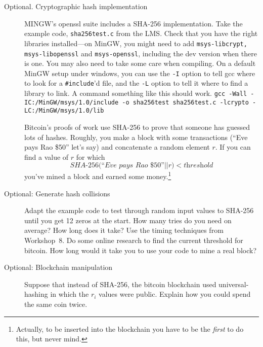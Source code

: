 \documentclass[11pt]{article}
\newcommand{\concat}{||}
\begin{document}
\begin{description}
\item[Optional.  Cryptographic hash implementation]
    MINGW's openssl suite includes a SHA-256 implementation.
        Take the example code,
        {\tt sha256test.c} from the {LMS}.
        Check that you have the right libraries installed---on MinGW,
        you might need to add {\tt msys-libcrypt, msys-libopenssl} and
        {\tt msys-openssl},
        including the dev version when there is one.
        You may also need to take some care when compiling.
        On a default MinGW setup under windows,
        you can use the {\tt -I} option to tell gcc where to look for a {\tt \#include}'d file,
        and the {\tt -L} option to tell it where to find a library to link.
        A command something like this should work.
        {\tt gcc -Wall -IC:/MinGW/msys/1.0/include -o sha256test sha256test.c -lcrypto -LC:/MinGW/msys/1.0/lib}

Bitcoin's proofs of work use SHA-256 to prove that someone has guessed lots of hashes.
        Roughly, you make a block with some transactions (``Eve pays Rao \$50'' let's say) and concatenate a random element $r$.
        If you can find a value of $r$ for which
        $$\textit{SHA-256(``Eve pays Rao \$50''} \concat r) < \textit{threshold}$$
        you've mined a block and earned some money.\footnote{
            Actually, to be inserted into the blockchain you have to be the \emph{first} to do this, but never mind.
        }

\item[Optional: Generate hash collisions]
    Adapt the example code to test through random input values to SHA-256 until you get 12 zeros at the start.
        How many tries do you need on average?
        How long does it take?
        Use the timing techniques from Workshop~8.
        Do some online research to find the current threshold for bitcoin.
        How long would it take you to use your code to mine a real block?

\item[Optional: Blockchain manipulation]  Suppose that instead of SHA-256,
    the bitcoin blockchain used universal-hashing in which the $r_i$ values were public.
        Explain how you could spend the same coin twice.


\end{description}
\end{document}
